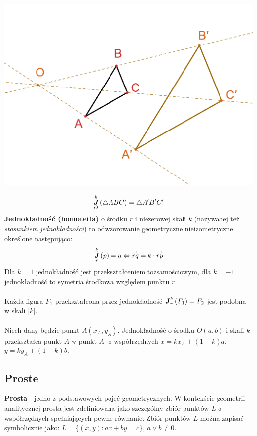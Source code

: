 \documentclass[14pt,a4paper]{extarticle}
\newcommand{\verts}[1]{\left\lvert#1\right\rvert}
\DeclareMathOperator{\homothet}{\textbf{\textit{J}}}
\newcommand{\Hom}[3][r]{\homothet^{#2}_{#1}\left(#3\right)}
\begin{document}
\begin{center}\includegraphics[scale=0.6]{geometria/jednokładność.PNG}\end{center}
$$\Hom[O]{k}{\triangle ABC} = \triangle A^{\prime}B^{\prime}C^{\prime}$$
\noindent \textbf{Jednokładność (homotetia)} o środku $r$ i niezerowej skali $k$
(nazywanej też \textit{stosunkiem jednokładności}) to odwzorowanie geometryczne nieizometryczne określone
następująco:
$$\Hom{k}{p} = q \Leftrightarrow \overset{\rightarrow}{rq} = k\cdot\overset{\rightarrow}{rp}$$
Dla $k=1$ jednokładność jest przekształceniem tożsamościowym, dla $k=-1$ jednokładność to symetria
środkowa względem punktu $r$.\\\\
Każda figura $F_{1}$ przekształcona przez jednokładność $\Hom{k}{F_{1}} = F_{2}$ jest podobna w
skali $\verts{k}$.\\\\

\noindent Niech dany będzie punkt $A(x_{A}, y_{A})$. Jednokładność o środku $O(a, b)$ i skali $k$
przekształca punkt $A$ w punkt $A^{\prime}$ o współrzędnych $x = kx_{A}+(1-k)a$,\break $y = ky_{A}+(1-k)b$.



\newpage
\subsection{Proste}
\noindent\textbf{Prosta} - jedno z podstawowych pojęć geometrycznych. W kontekście geometrii analitycznej
prosta jest zdefiniowana jako szczególny zbiór punktów $L$ o współrzędnych spełniających pewne równanie.
Zbiór punktów $L$ można zapisać symbolicznie jako: $L = \{(x, y): ax + by = c\},\: a \lor b \neq 0$.
\end{document}
